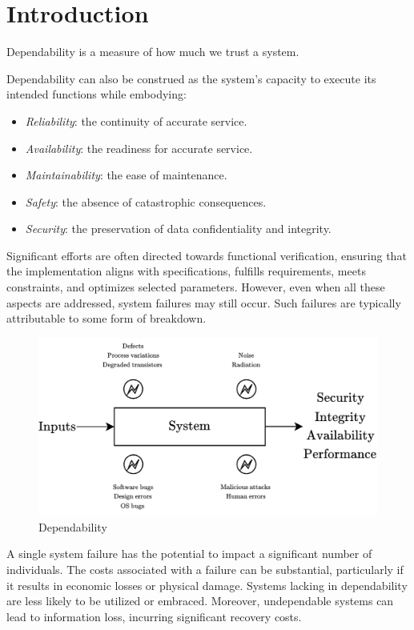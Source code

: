 \section{Introduction}

\begin{definition}
    Dependability is a measure of how much we trust a system. 
\end{definition}
Dependability can also be construed as the system's capacity to execute its intended functions while embodying:
\begin{itemize}
    \item \textit{Reliability}: the continuity of accurate service.
    \item \textit{Availability}: the readiness for accurate service.
    \item \textit{Maintainability}: the ease of maintenance.
    \item \textit{Safety}: the absence of catastrophic consequences.
    \item \textit{Security}: the preservation of data confidentiality and integrity.
\end{itemize}

Significant efforts are often directed towards functional verification, ensuring that the implementation aligns with specifications, fulfills requirements, meets constraints, and optimizes selected parameters.
However, even when all these aspects are addressed, system failures may still occur. 
Such failures are typically attributable to some form of breakdown.
\begin{figure}[H]
    \centering
    \includegraphics[width=0.75\linewidth]{images/dep.png}
    \caption{Dependability}
\end{figure}
A single system failure has the potential to impact a significant number of individuals.
The costs associated with a failure can be substantial, particularly if it results in economic losses or physical damage. 
Systems lacking in dependability are less likely to be utilized or embraced. 
Moreover, undependable systems can lead to information loss, incurring significant recovery costs.

